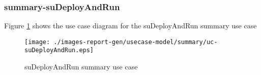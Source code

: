 \subsubsection{summary-suDeployAndRun}

\label{RE-use-case-suDeployAndRun}



Figure \ref{fig:lu.uni.lassy.excalibur.examples.icrash-RE-UCD-uc-suDeployAndRun}
shows the use case diagram for the suDeployAndRun summary use case

\begin{figure}[htbp]
\begin{center}

\texttt{[image: ./images-report-gen/usecase-model/summary/uc-suDeployAndRun.eps]}
\end{center}
\caption[lu.uni.lassy.excalibur.examples.icrash Use Case Diagram: uc-suDeployAndRun]{ suDeployAndRun summary use case}
\label{fig:lu.uni.lassy.excalibur.examples.icrash-RE-UCD-uc-suDeployAndRun}
\end{figure}
\vspace{0.5cm}

